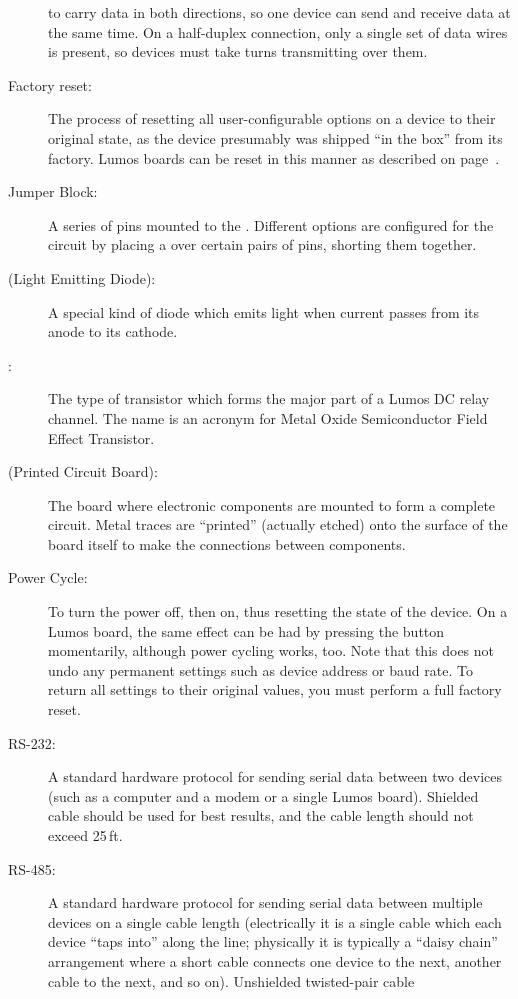 \documentclass[letterpaper,twoside,onecolumn,openright,final]{memoir}
\begin{document}
\begin{description}
		to carry data in both directions, so one device can send and receive data at the same time.
		On a half-duplex connection, only a single set of data wires is present, so devices must
		take turns transmitting over them.
	\item[Factory reset:]
		The process of resetting all user-configurable options on a device to their original state, as the
		device presumably was shipped ``in the box'' from its factory.  Lumos boards can be reset in this manner
		as described on page~\pageref{ss:factoryreset}.
	\item[Jumper Block:]
		A series of pins mounted to the .  Different options are configured for the
		circuit by placing a  over certain pairs of pins, shorting them together.
	\item[\acronym{LED} (Light Emitting Diode):]
		A special kind of diode which emits light when current passes from its anode to its cathode.
	\item[\acronym{MOSFET}:]
		The type of transistor which forms the major part of a Lumos DC relay channel.  The name
		is an acronym for Metal Oxide Semiconductor Field Effect Transistor.
	\item[\acronym{PCB} (Printed Circuit Board):]
		The board where electronic components are mounted to form a complete circuit.  Metal
		traces are ``printed'' (actually etched) onto the surface of the board itself to make the
		connections between components.
	\item[Power Cycle:]
		To turn the power off, then on, thus resetting the state of the device.  On a Lumos board,
		the same effect can be had by pressing the  button momentarily, although
		power cycling works, too.  Note that this does not undo any permanent settings such as device
		address or baud rate.  To return all settings to their original values, you must perform a
		full factory reset.
	\item[RS-232:]
		A standard hardware protocol for sending serial data between two devices (such as a computer
		and a modem or a single Lumos board).  Shielded cable should be used for best results, and
		the cable length should not exceed 25\,ft.
	\item[RS-485:]
		A standard hardware protocol for sending serial data between multiple devices on a single
		cable length (electrically it is a single cable which each device ``taps into'' along the
		line; physically it is typically a ``daisy chain'' arrangement where a short cable connects
		one device to the next, another cable to the next, and so on). Unshielded twisted-pair cable

\end{description}
\end{document}

